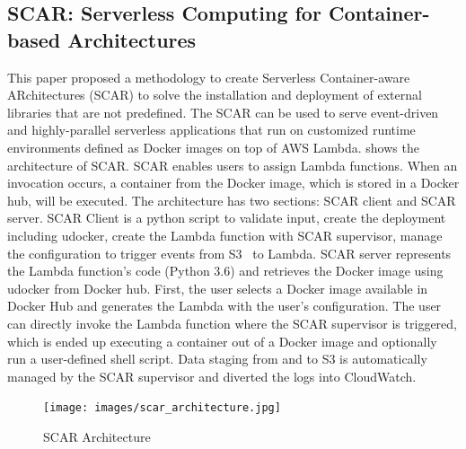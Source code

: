 \subsection*{SCAR: Serverless Computing for Container-based Architectures}
This paper proposed a methodology to create Serverless Container-aware ARchitectures (SCAR) \cite{PEREZ201850} to solve the installation and deployment of external libraries that are not predefined. The SCAR can be used to serve event-driven and highly-parallel serverless applications that run on customized runtime environments defined as Docker images on top of AWS Lambda.  shows the architecture of SCAR. SCAR enables users to assign Lambda functions. When an invocation occurs, a container from the Docker image, which is stored in a Docker hub, will be executed. The architecture has two sections: SCAR client and SCAR server. SCAR Client is a python script to validate input, create the deployment including udocker, create the Lambda function with SCAR supervisor, manage the configuration to trigger events from S3~\cite{s3} to Lambda. SCAR server represents the Lambda function's code (Python 3.6) and retrieves the Docker image using udocker from Docker hub. First, the user selects a Docker image available in Docker Hub and generates the Lambda with the user's configuration. The user can directly invoke the Lambda function where the SCAR supervisor is triggered, which is ended up executing a container out of a Docker image and optionally run a user-defined shell script. Data staging from and to S3 is automatically managed by the SCAR supervisor and diverted the logs into CloudWatch.
\begin{figure}[!t]
	\centering
	\texttt{[image: images/scar\_architecture.jpg]}
	\caption{SCAR Architecture \cite{PEREZ201850}}
	\centering
	\label{fig:scar_architecture}
\end{figure}

